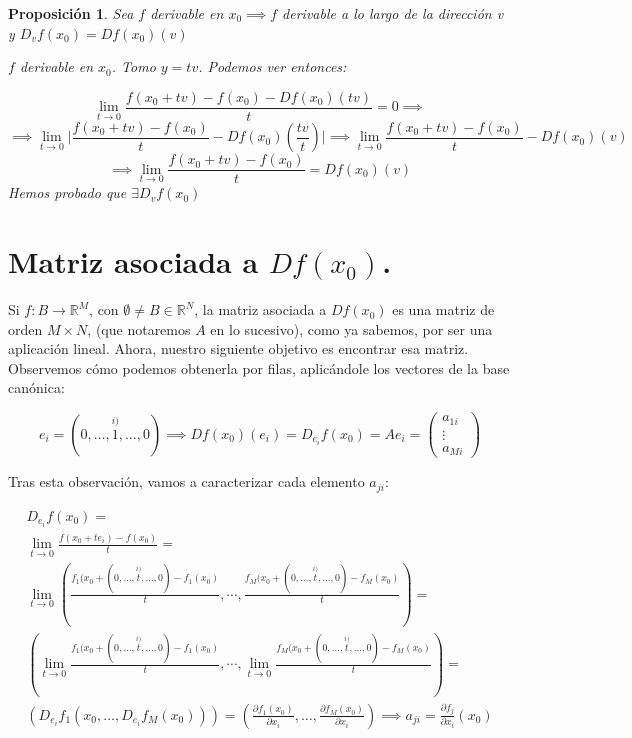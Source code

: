 \documentclass[11pt, a4paper, titlepage]{article}
\makeatletter
\renewenvironment{proof}[1][\proofname] {\vspace{-15pt}\par\pushQED{\qed}\normalfont\topsep6\p@\@plus6\p@\relax\trivlist\item[\hskip\labelsep\it#1\@addpunct{.}]\ignorespaces}{\popQED\endtrivlist\@endpefalse}
\providecommand{\abs}[1]{\lvert#1\rvert}
\theoremstyle{theorem-style}
\newtheorem*{nprop}{Proposición}
\theoremstyle{definition-style}
\theoremstyle{remark-style}
\theoremstyle{example-style}
\makeatother
\begin{document}
\begin{nprop}
	Sea $f$ derivable en $x_0\implies f$ derivable a lo largo de la dirección v y $D_vf(x_0) = Df(x_0)(v)$
	\begin{proof}
	$f$ derivable en $x_0$. Tomo $y=tv  $. Podemos ver entonces:
	
	\[
	\lim_{t \to 0} \frac{f(x_0 +tv) - f(x_0) - Df(x_0)(tv)}{t} = 0 \implies
	\]
	\[
	\implies \lim_{t \to 0} \abs{\frac{f(x_0 +tv) - f(x_0)}{t} - Df(x_0)(\frac{tv}{t})} \implies \lim_{t \to 0}\frac{f(x_0 +tv) -f(x_0)}{t} - Df(x_0)(v)
	\]
	\[
	\implies \lim_{t \to 0}\frac{f(x_0 +tv) - f(x_0)}{t} = Df(x_0)(v)
	\]
Hemos probado que $\exists D_vf(x_0)$
\end{proof}
\end{nprop}


\section{Matriz asociada a $Df(x_0)$.}
	Si $f : B \longrightarrow \mathbb{R}^M$, con $\emptyset \ne B \in \mathbb{R}^N$, la matriz asociada a $Df(x_0)$ es una matriz de orden $M \times N$, (que notaremos $A$ en lo sucesivo), como ya sabemos, por ser una aplicación lineal. Ahora, nuestro siguiente objetivo es encontrar esa matriz. Observemos cómo podemos obtenerla por filas, aplicándole los vectores de la base canónica:
	
	\[
		e_i = (0, \dots, \stackrel{i)}{1}, \dots, 0) \implies Df(x_0)(e_i) = D_{e_i}f(x_0) = Ae_i = \begin{pmatrix}
	a_{1i}\\ \vdots\\ a_{Mi}
\end{pmatrix}
	\]

Tras esta observación, vamos a caracterizar cada elemento $a_{ji}$:

\begin{align*}
	D_{e_i}f(x_0) = \\\lim_{t\to 0} \frac{f(x_0+te_i)-f(x_0)}{t} = \\\lim_{t\to 0} \left(\frac{f_1(x_0+(0,\dots,\stackrel{i)}{t},\dots,0)-f_1(x_0)}{t},\right.\left.\cdots, \frac{f_M(x_0+(0,\dots,\stackrel{i)}{t},\dots,0)-f_M(x_0)}{t}\right)=\\
	 \left(\lim_{t\to 0} \frac{f_1(x_0+(0,\dots,\stackrel{i)}{t},\dots,0)-f_1(x_0)}{t}, \cdots, \lim_{t\to 0} \frac{f_M(x_0+(0,\dots,\stackrel{i)}{t},\dots,0)-f_M(x_0)}{t}\right) =\\
	 \left(D_{e_i}f_1(x_0, \dots, D_{e_i}f_M(x_0))\right) = \left(\frac{\partial f_1(x_0)}{\partial x_i}, \dots, \frac{\partial f_M(x_0)}{\partial x_i}\right) \implies a_{ji} = \frac{\partial f_j}{\partial x_i} (x_0)
\end{align*}
\end{document}
